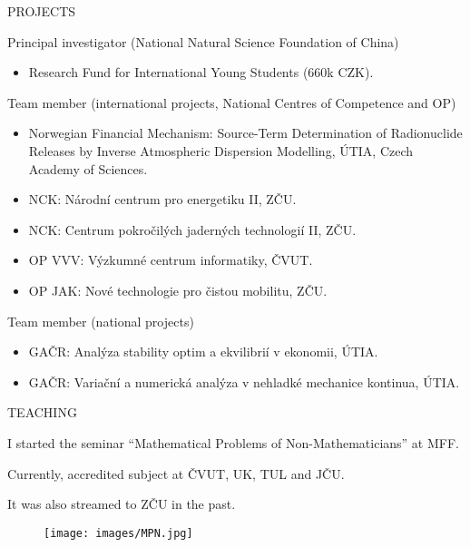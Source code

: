 \documentclass[11pt, aspectratio=169]{beamer}
\newenvironment{wideitemize}{\itemize\addtolength{\itemsep}{10pt}}{\enditemize}
\begin{document}
\begin{frame}{PROJECTS}
\begin{wideitemize}
\item Principal investigator (National Natural Science Foundation of China)
\begin{itemize}
\item Research Fund for International Young Students (660k CZK).
\end{itemize}
\pause \item Team member (international projects, National Centres of Competence and OP) %
\begin{itemize}
\item Norwegian Financial Mechanism: Source-Term Determination of Radionuclide Releases by Inverse Atmospheric Dispersion Modelling, \'UTIA, Czech Academy of Sciences.
\item NCK: Národní centrum pro energetiku II, ZČU. %
\item NCK: Centrum pokročilých jaderných technologií II, ZČU. %
\item OP VVV: Výzkumné centrum informatiky, ČVUT. %
\item OP JAK: Nové technologie pro čistou mobilitu, ZČU.
\end{itemize}
\pause \item Team member (national projects)
\begin{itemize}
\item GAČR: Analýza stability optim a ekvilibrií v ekonomii, ÚTIA.
\item GAČR: Variační a numerická analýza v nehladké mechanice kontinua, ÚTIA.
\end{itemize}
\end{wideitemize}
\end{frame}




\begin{frame}{TEACHING}
\begin{minipage}[t]{0.4\textwidth}
\begin{wideitemize}
\item I started the seminar ``Mathematical Problems of Non-Mathematicians'' at MFF.
\item Currently, accredited subject at ČVUT, UK, TUL and JČU.
\item It was also streamed to ZČU in the past.
\end{wideitemize}
\end{minipage}
\hfill
\begin{minipage}[t]{0.55\textwidth}
\begin{figure}
\texttt{[image: images/MPN.jpg]}
\end{figure}
\end{minipage}
\end{frame}
\end{document}
